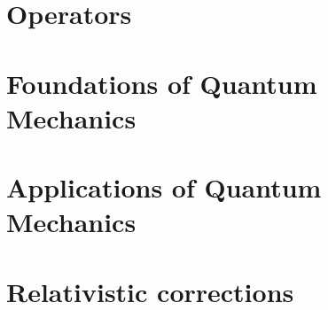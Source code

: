 \documentclass{../../physics_notes}
\begin{document}
\section{Operators}\label{sec:operators}


\section{Foundations of Quantum Mechanics}\label{sec:foundations}


\section{Applications of Quantum Mechanics}\label{sec:applications}


\section{Relativistic corrections}\label{sec:relativistic_corrections}

\end{document}
